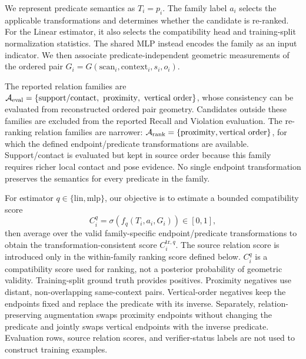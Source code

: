 We represent predicate semantics as $T_i=p_i$. The family label $a_i$ selects the applicable transformations and determines whether the candidate is re-ranked. For the Linear estimator, it also selects the compatibility head and training-split normalization statistics. The shared MLP instead encodes the family as an input indicator. We then associate predicate-independent geometric measurements of the ordered pair $G_i=G(\mathrm{scan}_i,\mathrm{context}_i,s_i,o_i)$.

The reported relation families are 
$\mathcal{A}_{\rm eval}=\{\mathrm{support/contact},\ \mathrm{proximity},\ \mathrm{vertical\ order}\}$, 
whose consistency can be evaluated from reconstructed ordered pair geometry. Candidates outside these families are excluded from the reported Recall and Violation evaluation. The re-ranking relation families are narrower: $\mathcal A_{\rm rank}=\{\mathrm{proximity},\mathrm{vertical\ order}\}$, for which the defined endpoint/predicate transformations are available. Support/contact is evaluated but kept in source order because this family requires richer local contact and pose evidence. No single endpoint transformation preserves the semantics for every predicate in the family. 

For estimator $q\in\{\mathrm{lin},\mathrm{mlp}\}$, our objective is to estimate a bounded compatibility score
\begin{equation}
C_i^q=\sigma\!\left(f_q(T_i,a_i,G_i)\right)\in[0,1],
\end{equation}
then average over the valid family-specific endpoint/predicate transformations to obtain the transformation-consistent score $C_i^{\mathrm{tr},q}$. The source relation score is introduced only in the within-family ranking score defined below. $C_i^q$ is a compatibility score used for ranking, not a posterior probability of geometric validity. Training-split ground truth provides positives. Proximity negatives use distant, non-overlapping same-context pairs. Vertical-order negatives keep the endpoints fixed and replace the predicate with its inverse. Separately, relation-preserving augmentation swaps proximity endpoints without changing the predicate and jointly swaps vertical endpoints with the inverse predicate. 
Evaluation rows, source relation scores, and verifier-status labels are not used to construct training examples. 

